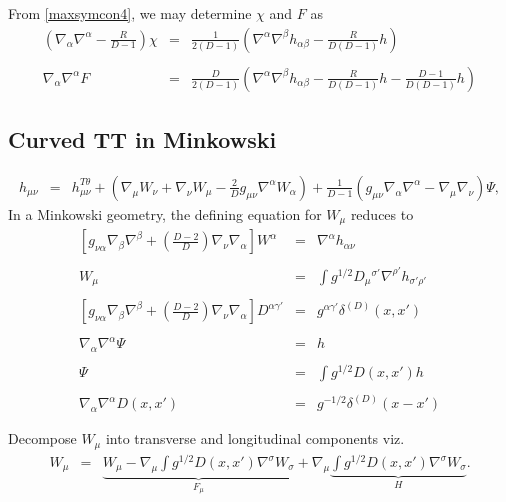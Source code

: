 \documentclass[10pt,letterpaper]{article}
\numberwithin{equation}{section}
\begin{document}
From \eqref{maxsymcon4}, we may determine $\chi$ and $F$ as
\begin{eqnarray}
\left( \nabla_\alpha\nabla^\alpha -\frac{R}{D-1}\right)\chi &=& \frac{1}{2(D-1)}\left( \nabla^\alpha\nabla^\beta h_{\alpha\beta}  - \frac{R}{D(D-1)}h\right)
\\ \nonumber\\
\nabla_\alpha\nabla^\alpha F &=& \frac{D}{2(D-1)}\left( \nabla^\alpha\nabla^\beta h_{\alpha\beta}  - \frac{R}{D(D-1)}h-\frac{D-1}{D(D-1)}h\right)
\end{eqnarray}
%
%
\subsection{Curved TT in Minkowski}
\begin{eqnarray}
h_{\mu\nu} &=& h_{\mu\nu}^{T\theta} + \left(\nabla_\mu W_\nu + \nabla_\nu W_\mu - \frac{2}{D}g_{\mu\nu}\nabla^\alpha W_\alpha\right) +\frac{1}{D-1}\left( g_{\mu\nu}\nabla_\alpha \nabla^\alpha - \nabla_\mu\nabla_\nu\right)\Psi,
\label{hdecomp3}
\end{eqnarray}
In a Minkowski geometry, the defining equation for $W_{\mu}$ reduces to
\begin{eqnarray}
\left[g_{\nu\alpha}\nabla_\beta\nabla^\beta + \left(\frac{D-2}{D}\right)\nabla_\nu \nabla_\alpha\right]W^\alpha
&=& \nabla^\alpha h_{\alpha\nu} 
\\ \nonumber\\
W_{\mu} &=& \int g^{1/2} D_\mu{}^{\sigma'} \nabla^{\rho'} h_{\sigma'\rho'}
\\ \nonumber\\
\left[g_{\nu\alpha}\nabla_\beta\nabla^\beta + \left(\frac{D-2}{D}\right)\nabla_\nu \nabla_\alpha \right]D^{\alpha\gamma'} &=& g^{\alpha\gamma'}  \delta^{(D)}(x,x')
\\ \nonumber\\
\nabla_\alpha\nabla^\alpha \Psi &=& h
\\ \nonumber\\
\Psi &=& \int g^{1/2}D(x,x')h
\\ \nonumber\\
\nabla_\alpha \nabla^\alpha D(x,x') &=& g^{-1/2}\delta^{(D)} (x-x')
\end{eqnarray}

Decompose $W_{\mu}$ into transverse and longitudinal components viz.
\begin{eqnarray}
W_{\mu} &=& \underbrace{W_{\mu} -\nabla_\mu \int g^{1/2} D(x,x')\nabla^{\sigma}W_\sigma}_{F_{\mu}} + \nabla_\mu \underbrace{ \int g^{1/2}D(x,x')\nabla^\sigma W_\sigma}_{H}.
\end{eqnarray}
\end{document}
